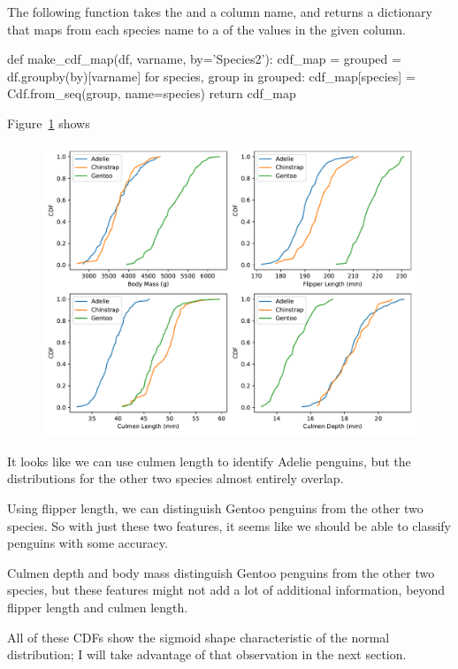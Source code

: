 \documentclass[12pt]{book}
\theoremstyle{exercise}
\begin{document}
The following function takes the  and
a column name, and returns a dictionary that maps from each species name
to a  of the values in the given column.

\begin{code}
def make_cdf_map(df, varname, by='Species2'):
    cdf_map = {}
    grouped = df.groupby(by)[varname]
    for species, group in grouped:
        cdf_map[species] = Cdf.from_seq(group, name=species)
    return cdf_map
\end{code}

Figure~\ref{fig10-01} shows

\begin{figure}
\centerline{\includegraphics[width=5.5in]{figs/fig10-01.pdf}}
\caption{}
\label{fig10-01}
\end{figure}

It looks like we can use culmen length to identify Adelie penguins, but
the distributions for the other two species almost entirely overlap.

Using flipper length, we can distinguish Gentoo penguins from the other
two species. So with just these two features, it seems like we should be
able to classify penguins with some accuracy.

Culmen depth and body mass distinguish Gentoo penguins from the other
two species, but these features might not add a lot of additional
information, beyond flipper length and culmen length.

All of these CDFs show the sigmoid shape characteristic of the normal
distribution; I will take advantage of that observation in the next
section.
\end{document}
